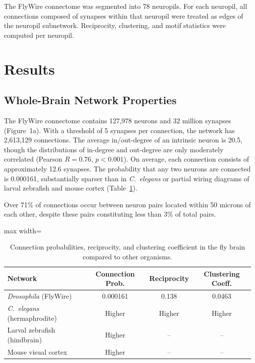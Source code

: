 \documentclass{article}
\begin{document}
The FlyWire connectome was segmented into 78 neuropils. For each neuropil, all connections composed of synapses within that neuropil were treated as edges of the neuropil subnetwork. Reciprocity, clustering, and motif statistics were computed per neuropil.

\section{Results}

\subsection{Whole-Brain Network Properties}

The FlyWire connectome contains 127,978 neurons and 32 million synapses (Figure~1a). With a threshold of 5 synapses per connection, the network has 2,613,129 connections. The average in/out-degree of an intrinsic neuron is 20.5, though the distributions of in-degree and out-degree are only moderately correlated (Pearson $R = 0.76$, $p < 0.001$). On average, each connection consists of approximately 12.6 synapses. The probability that any two neurons are connected is 0.000161, substantially sparser than in \textit{C.~elegans} or partial wiring diagrams of larval zebrafish and mouse cortex (Table~\ref{tab:network_stats}).

Over 71\% of connections occur between neuron pairs located within 50 microns of each other, despite these pairs constituting less than 3\% of total pairs.

\begin{table}[htbp]
\centering
\caption{Connection probabilities, reciprocity, and clustering coefficient in the fly brain compared to other organisms.}
\label{tab:network_stats}
\begin{adjustbox}{max width=\textwidth}
\begin{tabular}{lccc}
\toprule
Network & Connection Prob. & Reciprocity & Clustering Coeff. \\
\midrule
\textit{Drosophila} (FlyWire) & 0.000161 & 0.138 & 0.0463 \\
\textit{C.~elegans} (hermaphrodite) & Higher & Higher & Higher \\
Larval zebrafish (hindbrain) & Higher & -- & -- \\
Mouse visual cortex & Higher & -- & -- \\
\bottomrule
\end{tabular}
\end{adjustbox}
\end{table}
\end{document}
